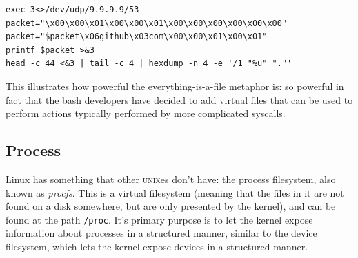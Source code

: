 \documentclass[a4paper]{article}
\begin{document}
\begin{verbatim}
exec 3<>/dev/udp/9.9.9.9/53
packet="\x00\x00\x01\x00\x00\x01\x00\x00\x00\x00\x00\x00"
packet="$packet\x06github\x03com\x00\x00\x01\x00\x01"
printf $packet >&3
head -c 44 <&3 | tail -c 4 | hexdump -n 4 -e '/1 "%u" "."'
\end{verbatim}
This illustrates how powerful the everything-is-a-file metaphor is: so powerful in fact that the bash developers have decided to add virtual files that can be used to perform actions typically performed by more complicated syscalls.


\subsection{Process}




Linux has something that other \textsc{unix}es don't have: the process filesystem, also known as \emph{procfs}. This is a virtual filesystem (meaning that the files in it are not found on a disk somewhere, but are only presented by the kernel), and can be found at the path \verb|/proc|. It's primary purpose is to let the kernel expose information about processes in a structured manner, similar to the device filesystem, which lets the kernel expose devices in a structured manner.
\end{document}
